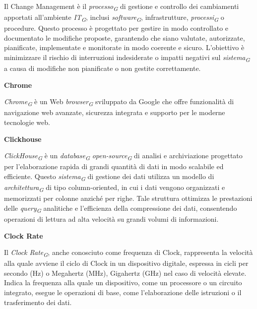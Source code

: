 \documentclass{article}
\begin{document}
Il Change Management è il \textit{processo}\textsubscript{\textit{G}} di gestione e controllo dei cambiamenti apportati all'ambiente \textit{IT}\textsubscript{\textit{G}}, inclusi \textit{software}\textsubscript{\textit{G}}, infrastrutture, \textit{processi}\textsubscript{\textit{G}} o procedure. Questo processo è progettato per gestire in modo controllato e documentato le modifiche proposte, garantendo che siano valutate, autorizzate, pianificate, implementate e monitorate in modo coerente e sicuro. L'obiettivo è minimizzare il rischio di interruzioni indesiderate o impatti negativi sul \textit{sistema}\textsubscript{\textit{G}} a causa di modifiche non pianificate o non gestite correttamente.

\vspace{0.4cm}

\textbf{Chrome}

\vspace{0.1cm}

\textit{Chrome}\textsubscript{\textit{G}} è un Web \textit{browser}\textsubscript{\textit{G}} sviluppato da Google che offre funzionalità di navigazione web avanzate, sicurezza integrata e supporto per le moderne tecnologie web.

\vspace{0.4cm}

\textbf{Clickhouse}

\vspace{0.1cm}

\textit{ClickHouse}\textsubscript{\textit{G}} è un \textit{database}\textsubscript{\textit{G}} \textit{open-source}\textsubscript{\textit{G}} di analisi e archiviazione progettato per l'elaborazione rapida di grandi quantità di dati in modo scalabile ed efficiente. Questo \textit{sistema}\textsubscript{\textit{G}} di gestione dei dati utilizza un modello di \textit{architettura}\textsubscript{\textit{G}} di tipo column-oriented, in cui i dati vengono organizzati e memorizzati per colonne anziché per righe. Tale struttura ottimizza le prestazioni delle \textit{query}\textsubscript{\textit{G}} analitiche e l'efficienza della compressione dei dati, consentendo operazioni di lettura ad alta velocità su grandi volumi di informazioni. 

\vspace{0.4cm}

\textbf{Clock Rate}

\vspace{0.1cm}

Il \textit{Clock Rate}\textsubscript{\textit{G}}, anche conosciuto come frequenza di Clock, rappresenta la velocità alla quale avviene il ciclo di Clock in un dispositivo digitale, espressa in cicli per secondo (Hz) o Megahertz (MHz), Gigahertz (GHz) nel caso di velocità elevate. Indica la frequenza alla quale un dispositivo, come un processore o un circuito integrato, esegue le operazioni di base, come l'elaborazione delle istruzioni o il trasferimento dei dati. 
\end{document}
